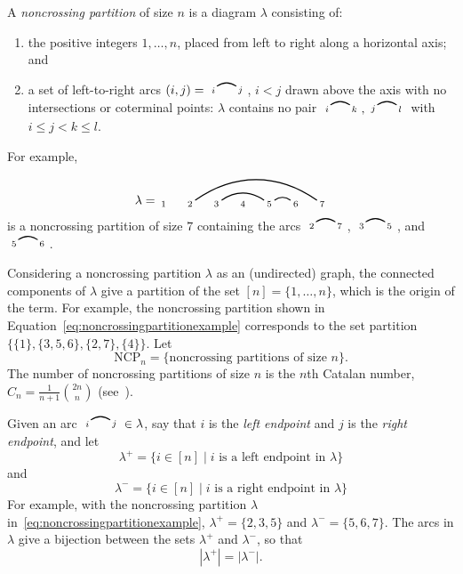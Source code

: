 \documentclass[12pt]{amsart}
\theoremstyle{definition}
\theoremstyle{remark}
\numberwithin{equation}{section}
\newcommand{\NCP}{\mathrm{NCP}}
\newcommand{\edge}[2]{\tikz[scale = 0.75, baseline = -0.2cm]{
\draw (0.1, 0) node[inner sep = 0ex] (a) {};
\node[left, xshift = 0.1cm, yshift = -0.1cm] at (a) {$\scriptstyle #1$};
\draw (0.9, 0)  node[inner sep = 0ex] (b) {};
\node[right, xshift = -0.1cm, yshift = -0.1cm] at (b) {$\scriptstyle #2$};
\draw[thick] (a) to[out = 35, in = 145] (b);}}
\begin{document}

A \emph{noncrossing partition} of size $n$ is a diagram $\lambda$ consisting of:
\begin{enumerate}
\item the positive integers $1, \ldots, n$, placed from left to right along a horizontal axis; and

\item a set of left-to-right arcs $ (i, j) = \edge{i}{j}$, $i < j$ drawn above the axis with no intersections or coterminal points: $\lambda$ contains no pair $\edge{i}{k}, \edge{j}{l}$ with $i \le j < k \le l$.

\end{enumerate}
For example,
\begin{equation}
\label{eq:noncrossingpartitionexample}
\lambda = \begin{tikzpicture}[scale = 0.75, baseline = 0.75*-0.2]
\foreach \x in {1, ..., 7}{\draw[fill] (\x - 1, 0) node[inner sep = 2pt] (\x) {$\scriptstyle \x$};}
\foreach \i\j in {5/6, 3/5,2/7}{\draw[thick] (\i) to[out = 35, in = 145] (\j);}
\end{tikzpicture}
\end{equation}
is a noncrossing partition of size $7$ containing the arcs $\edge{2}{7}$, $\edge{3}{5}$, and $\edge{5}{6}$.

Considering a noncrossing partition $\lambda$ as an (undirected) graph, the connected components of $\lambda$ give a partition of the set $[n] = \{1, \ldots, n\}$, which is the origin of the term.  For example, the noncrossing partition shown in Equation~\eqref{eq:noncrossingpartitionexample} corresponds to the set partition $\{ \{1\}, \{3, 5, 6\}, \{2, 7\}, \{4\}  \}$.  Let
\[
\NCP_{n} = \{ \text{noncrossing partitions of size $n$} \}.
\]
The number of noncrossing partitions of size $n$ is the $n$th Catalan number, $C_{n} = \frac{1}{n+1}\binom{2n}{n}$ (see~\cite{Stanley}).

Given an arc $ \edge{i}{j} \in \lambda$, say that $i$ is the \emph{left endpoint} and $j$ is the \emph{right endpoint}, and let
\[
\lambda^{+} = \{ i \in [n] \;|\; \text{$i$ is a left endpoint in $\lambda$} \}
\]
and
\[
\lambda^{-} = \{ i \in [n] \;|\; \text{$i$ is a right endpoint in $\lambda$} \}
\]
For example, with the noncrossing partition $\lambda$ in~\eqref{eq:noncrossingpartitionexample}, $\lambda^{+} = \{2, 3, 5\}$ and $\lambda^{-} = \{5, 6, 7\}$.  The arcs in $\lambda$ give a bijection between the sets $\lambda^{+}$ and $\lambda^{-}$, so that
\[
|\lambda^{+}| = |\lambda^{-}|.
\]
\end{document}
